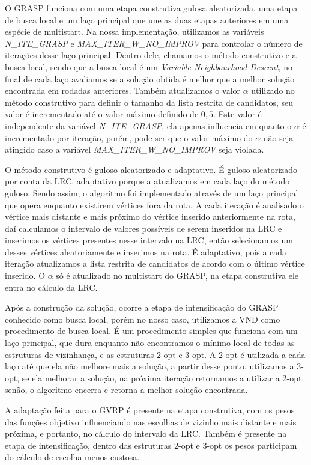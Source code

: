 \documentclass[12pt, a4paper]{article}
\begin{document}
O GRASP funciona com uma etapa construtiva gulosa aleatorizada, uma etapa de busca local e um laço principal que une as duas etapas anteriores em uma espécie de multistart. Na nossa implementação, utilizamos as variáveis \textit{N\_ITE\_GRASP} e \textit{MAX\_ITER\_W\_NO\_IMPROV} para controlar o número de iterações desse laço principal. Dentro dele, chamamos o método construtivo e a busca local, sendo que a busca local é um \textit{Variable Neighbourhood Descent}, no final de cada laço avaliamos se a solução obtida é melhor que a melhor solução encontrada em rodadas anteriores. Também atualizamos o valor $\alpha$ utilizado no método construtivo para definir o tamanho da lista restrita de candidatos, seu valor é incrementado até o valor máximo definido de $0,5$. Este valor é independente da variável \textit{N\_ITE\_GRASP}, ela apenas influencia em quanto o $\alpha$ é incrementado por iteração, porém, pode ser que o valor máximo do $\alpha$ não seja atingido caso a variável \textit{MAX\_ITER\_W\_NO\_IMPROV} seja violada.\par
O método construtivo é guloso aleatorizado e adaptativo. É guloso aleatorizado por conta da LRC, adaptativo porque a atualizamos em cada laço do método guloso. Sendo assim, o algoritmo foi implementado através de um laço principal que opera enquanto existirem vértices fora da rota. A cada iteração é analisado o vértice mais distante e mais próximo do vértice inserido anteriormente na rota, daí calculamos o intervalo de valores possíveis de serem inseridos na LRC e inserimos os vértices presentes nesse intervalo na LRC, então selecionamos um desses vértices aleatoriamente e inserimos na rota. É adaptativo, pois a cada iteração atualizamos a lista restrita de candidatos de acordo com o último vértice inserido. O $\alpha$ só é atualizado no multistart do GRASP, na etapa construtiva ele entra no cálculo da LRC.\par
Após a construção da solução, ocorre a etapa de intensificação do GRASP conhecido como busca local, porém no nosso caso, utilizamos a VND como procedimento de busca local. É um procedimento simples que funciona com um laço principal, que dura enquanto não encontramos o mínimo local de todas as estruturas de vizinhança, e as estruturas 2-opt e 3-opt. A 2-opt é utilizada a cada laço até que ela não melhore mais a solução, a partir desse ponto, utilizamos a 3-opt, se ela melhorar a solução, na próxima iteração retornamos a utilizar a 2-opt, senão, o algoritmo encerra e retorna a melhor solução encontrada.\par
A adaptação feita para o GVRP é presente na etapa construtiva, com os pesos das funções objetivo influenciando nas escolhas de vizinho mais distante e mais próxima, e portanto, no cálculo do intervalo da LRC. Também é presente na etapa de intensificação, dentro das estruturas 2-opt e 3-opt os pesos participam do cálculo de escolha menos custosa.
\end{document}
